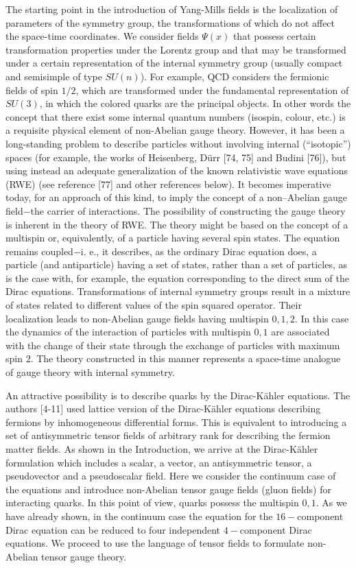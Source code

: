 \documentclass[a4paper,12pt]{article}
\begin{document}
The starting point in the introduction of Yang-Mills fields is the
localization of parameters of the symmetry group, the
transformations of which do not affect the space-time coordinates.
We consider fields $\Psi (x)$ that possess certain transformation
properties under the Lorentz group and that may be transformed
under a certain representation of the internal symmetry group
(usually compact and semisimple of type $SU(n)$). For example, QCD
considers the fermionic fields of spin $1/2$, which are
transformed under the fundamental representation of $SU(3)$, in
which the colored quarks are the principal objects. In other words
the concept that there exist some internal quantum numbers
(isospin, colour, etc.) is a requisite physical element of
non-Abelian gauge theory. However, it has been a long-standing
problem to describe particles without involving internal
(``isotopic'') spaces (for example, the works of Heisenberg,
D\"urr [74, 75] and Budini [76]), but using instead an adequate
generalization of the known relativistic wave equations (RWE) (see
reference [77] and other references below). It becomes imperative
today, for an approach of this kind, to imply the concept of a
non--Abelian gauge field$-$the carrier of interactions. The
possibility of constructing the gauge theory is inherent in the
theory of RWE. The theory might be based on the concept of a
multispin or, equivalently, of a particle having several spin
states. The equation remains coupled$-$i. e., it describes, as the
ordinary Dirac equation does, a particle (and antiparticle) having
a set of states, rather than a set of particles, as is the case
with, for example, the equation corresponding to the direct sum of
the Dirac equations. Transformations of internal symmetry groups
result in a mixture of states related to different values of the
spin squared operator. Their localization leads to non-Abelian
gauge fields having multispin $0,1,2$. In this case the dynamics
of the interaction of particles with multispin $0,1$ are
associated with the change of their state through the exchange of
particles with maximum spin $2$. The theory constructed in this
manner represents a space-time analogue of gauge theory with
internal symmetry.

An attractive possibility is to describe quarks by the Dirac-K\"ahler
equations. The authors [4-11] used lattice version of the Dirac-K\"ahler
equations describing fermions by inhomogeneous differential forms. This is
equivalent to introducing a set of antisymmetric tensor fields of arbitrary
rank for describing the fermion matter fields. As shown in the Introduction,
we arrive at the Dirac-K\"ahler formulation which includes a scalar, a
vector, an antisymmetric tensor, a pseudovector and a pseudoscalar field.
Here we consider the continuum case of the equations and introduce
non-Abelian tensor gauge fields (gluon fields) for interacting quarks. In
this point of view, quarks possess the multispin $0,1$. As we have already
shown, in the continuum case the equation for the $16-$component Dirac
equation can be reduced to four independent $4-$component Dirac equations.
We proceed to use the language of tensor fields to formulate non-Abelian
tensor gauge theory.
\end{document}
